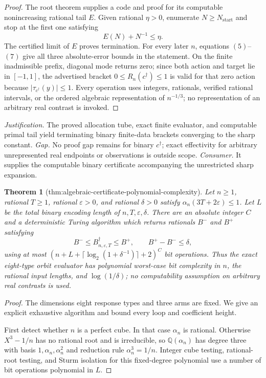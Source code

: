 \documentclass{article}
\newtheorem{theorem}{Theorem}
\begin{document}
{\begin{proof}
The root theorem supplies a code and proof for its computable nonincreasing rational tail \(E\).  Given rational \(\eta>0\), enumerate
\(N\ge N_{\mathrm{start}}\) and stop at the first one satisfying
\[
E(N)+N^{-1}\le\eta.
\tag{7}
\]
The certified limit of \(E\) proves termination.  For every later \(n\), equations \((5)\)--\((7)\) give all three absolute-error bounds in the statement.  On the finite inadmissible prefix, diagonal mode returns zero; since both action and target lie in \([-1,1]\), the advertised bracket
\(0\le R_n(c^\dagger)\le1\) is valid for that zero action because
\(|\tau_{c^\dagger}(y)|\le1\).  Every operation uses integers, rationals, verified rational intervals, or the ordered algebraic representation of \(n^{-1/3}\); no representation of an arbitrary real contrast is invoked.
\end{proof}
\par\smallskip\noindent \textit{Justification.} The proved allocation tube, exact finite evaluator, and computable primal tail yield terminating binary finite-data brackets converging to the sharp constant. \textit{Gap.} No proof gap remains for binary \(c^\dagger\); exact effectivity for arbitrary unrepresented real endpoints or observations is outside scope. \textit{Consumer.} It supplies the computable binary certificate accompanying the unrestricted sharp expansion.

\begin{theorem}[thm:algebraic-certificate-polynomial-complexity]\label{thm:algebraic-certificate-polynomial-complexity}
Let \(n\ge1\), rational \(T\ge1\), rational \(\varepsilon>0\), and rational \(\delta>0\) satisfy \(\alpha_n(3T+2\varepsilon)\le1\).  Let \(L\) be the total binary encoding length of \(n,T,\varepsilon,\delta\).  There are an absolute integer \(C\) and a deterministic Turing algorithm which returns rationals \(B^-\) and \(B^+\) satisfying
\[
B^-\le B_{n,\varepsilon,T}^\dagger\le B^+,
\qquad B^+-B^-\le\delta,
\]
using at most \((n+L+\lceil\log_2(1+\delta^{-1})\rceil+2)^C\) bit operations.  Thus the exact eight-type orbit evaluator has polynomial worst-case bit complexity in \(n\), the rational input lengths, and \(\log(1/\delta)\); no computability assumption on arbitrary real contrasts is used.
\end{theorem}
\begin{proof}
The dimensions eight response types and three arms are fixed.  We give an explicit exhaustive algorithm and bound every loop and coefficient height.

First detect whether \(n\) is a perfect cube.  In that case \(\alpha_n\) is rational.  Otherwise \(X^3-1/n\) has no rational root and is irreducible, so \(\mathbb Q(\alpha_n)\) has degree three with basis \(1,\alpha_n,\alpha_n^2\) and reduction rule \(\alpha_n^3=1/n\).  Integer cube testing, rational-root testing, and Sturm isolation for this fixed-degree polynomial use a number of bit operations polynomial in \(L\).


\end{proof}}
\end{document}
